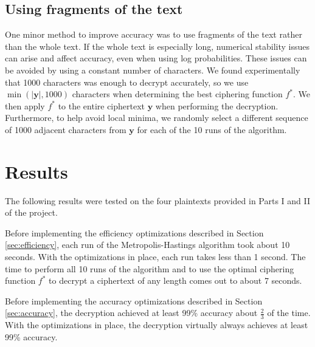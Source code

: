 \documentclass{article}
\begin{document}
\subsection{Using fragments of the text}

One minor method to improve accuracy was to use fragments of the text rather than the whole text. If the whole text is especially long, numerical stability issues can arise and affect accuracy, even when using log probabilities. These issues can be avoided by using a constant number of characters. We found experimentally that 1000 characters was enough to decrypt accurately, so we use $\min(|\mathbf{y}|, 1000)$ characters when determining the best ciphering function $f^*$. We then apply $f^*$ to the entire ciphertext $\mathbf{y}$ when performing the decryption. Furthermore, to help avoid local minima, we randomly select a different sequence of 1000 adjacent characters from $\mathbf{y}$ for each of the 10 runs of the algorithm.

\section{Results}\label{sec:results}

The following results were tested on the four plaintexts provided in Parts I and II of the project.

Before implementing the efficiency optimizations described in Section \ref{sec:efficiency}, each run of the Metropolis-Hastings algorithm took about 10 seconds. With the optimizations in place, each run takes less than 1 second. The time to perform all 10 runs of the algorithm and to use the optimal ciphering function $f^*$ to decrypt a ciphertext of any length comes out to about 7 seconds.

Before implementing the accuracy optimizations described in Section \ref{sec:accuracy}, the decryption achieved at least 99\% accuracy about $\frac{2}{3}$ of the time. With the optimizations in place, the decryption virtually always achieves at least 99\% accuracy.
\end{document}
